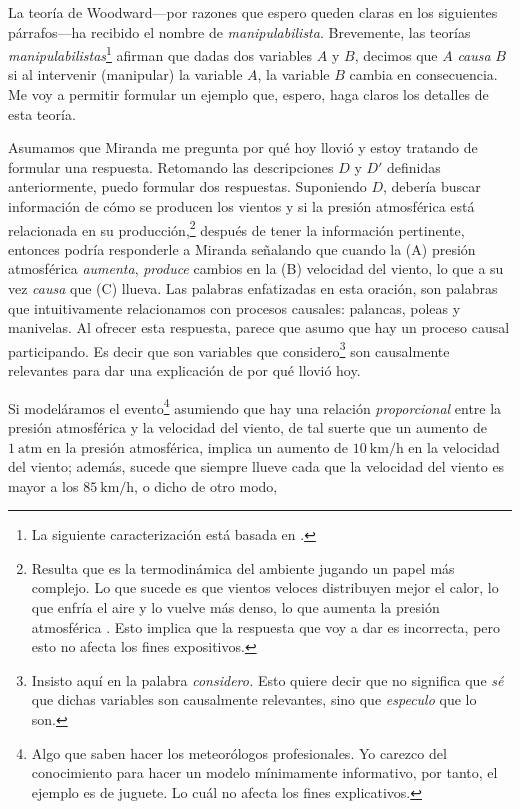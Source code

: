 La teoría de Woodward---por razones que espero queden claras en
los siguientes párrafos---ha recibido el nombre de
\emph{manipulabilista}. Brevemente, las teorías
\emph{manipulabilistas}\footnote{
  La siguiente  caracterización está basada en
  \parencite{sep-causation-mani,
             sep-causal-explanation-science, 
             Woodward2004,
             Woodward2000-WOOEAI}. 
}
afirman que dadas dos variables $ A $ y $ B $, decimos que $
A $ \emph{causa} $ B $ si al intervenir (manipular) la
variable $ A $, la variable $ B $ cambia en consecuencia. Me
voy a permitir formular un ejemplo que, espero, haga claros
los detalles de esta teoría.

Asumamos que Miranda me pregunta por qué hoy llovió y estoy
tratando de formular una respuesta. Retomando las
descripciones $ D $ y $ D' $ definidas anteriormente, puedo
formular dos respuestas. Suponiendo $ D $, debería buscar
información de cómo se producen los vientos y si la presión
atmosférica está relacionada en su producción,\footnote{
  Resulta que es la termodinámica del ambiente jugando un
  papel más complejo. Lo que sucede es que vientos veloces
  distribuyen mejor el calor, lo que enfría el aire y lo
  vuelve más denso, lo que aumenta la presión atmosférica
  \parencite{Spiridonov2021}. Esto implica que la respuesta
  que voy a dar es incorrecta, pero esto no afecta los fines
  expositivos. 
}
después de tener la información pertinente, entonces podría
responderle a Miranda señalando que cuando la (A) presión
atmosférica \emph{aumenta}, \emph{produce} cambios en la (B)
velocidad del viento, lo que a su vez \emph{causa} que (C)
llueva. Las palabras enfatizadas en esta oración, son
palabras que intuitivamente relacionamos con procesos
causales: palancas, poleas y manivelas. Al ofrecer esta
respuesta, parece que asumo que hay un proceso causal
participando. Es decir que son variables que
considero\footnote{ 
  Insisto aquí en la palabra \emph{considero.} Esto quiere
  decir que no significa que \emph{sé} que dichas variables
  son causalmente relevantes, sino que \emph{especulo} que
  lo son.
} 
son causalmente	relevantes para dar una explicación de por
qué llovió hoy.

Si modeláramos el evento\footnote{
	Algo que saben hacer los meteorólogos profesionales. Yo
	carezco del conocimiento para hacer un modelo mínimamente
	informativo, por tanto, el ejemplo es de juguete. Lo
	cuál  no afecta los fines explicativos. 
} 
asumiendo que hay una relación \emph{proporcional} entre la
presión atmosférica y la velocidad del viento, de tal suerte
que un aumento de $1~\text{atm}$ en la presión atmosférica,
implica un aumento de $ 10~\text{km/h} $ en la velocidad del
viento; además, sucede que siempre llueve cada que la
velocidad del viento es mayor a los $ 85~\text{km/h} $, o
dicho de otro modo, 

